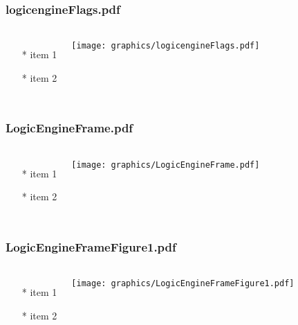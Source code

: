 \begin{frame} \frametitle{logicengineFlags.pdf}
    \begin{columns}[c]
        \begin{itemize}
            \item[*] item 1
            \item[*] item 2
        \end{itemize}
        \begin{minipage}{\linewidth}
            \begin{center}
            \texttt{[image: graphics/logicengineFlags.pdf]}
            \label{gfx:logicengineFlags.pdf}
            \end{center}
        \end{minipage}
    \end{columns}
\end{frame}
\begin{frame} \frametitle{LogicEngineFrame.pdf}
    \begin{columns}[c]
        \begin{itemize}
            \item[*] item 1
            \item[*] item 2
        \end{itemize}
        \begin{minipage}{\linewidth}
            \begin{center}
            \texttt{[image: graphics/LogicEngineFrame.pdf]}
            \label{gfx:LogicEngineFrame.pdf}
            \end{center}
        \end{minipage}
    \end{columns}
\end{frame}
\begin{frame} \frametitle{LogicEngineFrameFigure1.pdf}
    \begin{columns}[c]
        \begin{itemize}
            \item[*] item 1
            \item[*] item 2
        \end{itemize}
        \begin{minipage}{\linewidth}
            \begin{center}
            \texttt{[image: graphics/LogicEngineFrameFigure1.pdf]}
            \label{gfx:LogicEngineFrameFigure1.pdf}
            \end{center}
        \end{minipage}
    \end{columns}
\end{frame}
